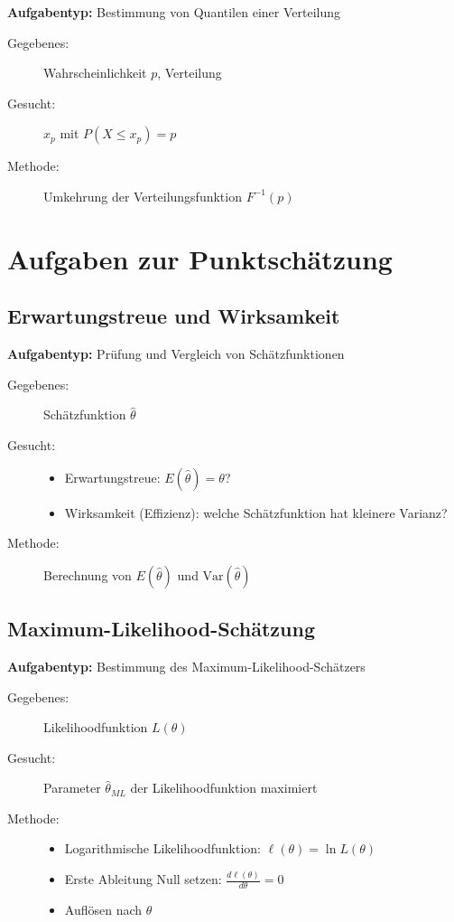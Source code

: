 \documentclass[12pt, a4paper, titlepage, ngerman]{scrartcl}
\begin{document}
\textbf{Aufgabentyp:} Bestimmung von Quantilen einer Verteilung

\begin{description}
  \item[Gegebenes:] Wahrscheinlichkeit $p$, Verteilung
  \item[Gesucht:] $x_p$ mit $P(X \leq x_p) = p$
  \item[Methode:] Umkehrung der Verteilungsfunktion $F^{-1}(p)$
\end{description}

\section{Aufgaben zur Punktschätzung}

\subsection{Erwartungstreue und Wirksamkeit}

\textbf{Aufgabentyp:} Prüfung und Vergleich von Schätzfunktionen

\begin{description}
  \item[Gegebenes:] Schätzfunktion $\hat{\theta}$
  \item[Gesucht:] 
    \begin{itemize}
      \item Erwartungstreue: $E(\hat{\theta}) = \theta$?
      \item Wirksamkeit (Effizienz): welche Schätzfunktion hat kleinere Varianz?
    \end{itemize}
  \item[Methode:] Berechnung von $E(\hat{\theta})$ und $\text{Var}(\hat{\theta})$
\end{description}

\subsection{Maximum-Likelihood-Schätzung}

\textbf{Aufgabentyp:} Bestimmung des Maximum-Likelihood-Schätzers

\begin{description}
  \item[Gegebenes:] Likelihoodfunktion $L(\theta)$
  \item[Gesucht:] Parameter $\hat{\theta}_{ML}$ der Likelihoodfunktion maximiert
  \item[Methode:] 
    \begin{itemize}
      \item Logarithmische Likelihoodfunktion: $\ell(\theta) = \ln L(\theta)$
      \item Erste Ableitung Null setzen: $\frac{d\ell(\theta)}{d\theta} = 0$
      \item Auflösen nach $\theta$
    \end{itemize}
\end{description}
\end{document}
